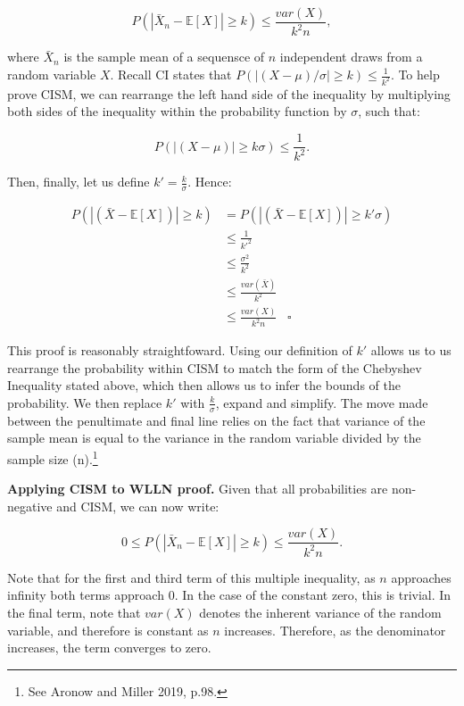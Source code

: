 \documentclass[
]{book}
\begin{document}
\begin{equation}
 P(|\bar{X}_n-\mathbb{E}[X]| \geq k) \leq \frac{var(X)}{k^2 n},
\end{equation}

where \(\bar{X}_n\) is the sample mean of a sequensce of \(n\) independent draws from a random variable \(X\). Recall CI states that \(P(|(X-\mu)/\sigma| \geq k) \leq \frac{1}{k^2}\). To help prove CISM, we can rearrange the left hand side of the inequality by multiplying both sides of the inequality within the probability function by \(\sigma\), such that:

\begin{equation}
   P(|(X-\mu)| \geq k \sigma) \leq \frac{1}{k^2}.
\end{equation}

Then, finally, let us define \(k' = \frac{k}{\sigma}\). Hence:

\begin{align}
  P(|(\bar{X}-\mathbb{E}[X])| \geq k) &= P(|(\bar{X}-\mathbb{E}[X])| \geq k'\sigma) \\
  &\leq \frac{1}{{k'}^2} \\
  &\leq \frac{\sigma^2}{k^2} \\ 
  &\leq \frac{var(\bar{X})}{k^2} \\
  &\leq \frac{var(X)}{k^2 n} \; \; \; \square
\end{align}

This proof is reasonably straightfoward. Using our definition of \(k'\) allows us to us rearrange the probability within CISM to match the form of the Chebyshev Inequality stated above, which then allows us to infer the bounds of the probability. We then replace \(k'\) with \(\frac{k}{\sigma}\), expand and simplify. The move made between the penultimate and final line relies on the fact that variance of the sample mean is equal to the variance in the random variable divided by the sample size (n).\footnote{See Aronow and Miller 2019, p.98.}

\textbf{Applying CISM to WLLN proof.} Given that all probabilities are non-negative and CISM, we can now write:

\begin{equation}
  0 \leq P(|\bar{X}_n−\mathbb{E}[X]| \geq k) \leq \frac{var(X)}{k^2n}. \label{eq:multi_ineq}
\end{equation}

Note that for the first and third term of this multiple inequality, as \(n\) approaches infinity both terms approach 0. In the case of the constant zero, this is trivial. In the final term, note that \(var(X)\) denotes the inherent variance of the random variable, and therefore is constant as \(n\) increases. Therefore, as the denominator increases, the term converges to zero.
\end{document}
